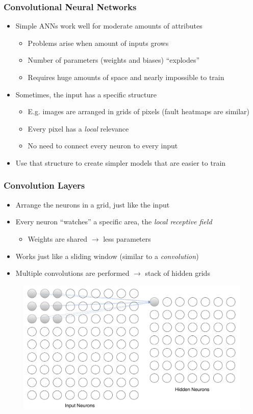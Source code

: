 \begin{frame}
  \frametitle{Convolutional Neural Networks}
  \begin{itemize}
    \item Simple ANNs work well for moderate amounts of attributes
      \begin{itemize}
        \item Problems arise when amount of inputs grows
        \item Number of parameters (weights and biases) ``explodes''
        \item Requires huge amounts of space and nearly impossible to
          train
      \end{itemize}
    \item Sometimes, the input has a specific structure
      \begin{itemize}
        \item E.g. images are arranged in grids of pixels (fault
          heatmaps are similar)
        \item Every pixel has a \textit{local} relevance
        \item No need to connect every neuron to every input
      \end{itemize}
    \item Use that structure to create simpler models that are easier
      to train
  \end{itemize}
\end{frame}

\begin{frame}
  \frametitle{Convolution Layers}
  \begin{itemize}
    \item Arrange the neurons in a grid, just like the input
    \item Every neuron ``watches'' a specific area, the \textit{local
      receptive field}
      \begin{itemize}
        \item Weights are shared \(\rightarrow\) less parameters
      \end{itemize}
    \item Works just like a sliding window (similar to a
      \textit{convolution})
    \item Multiple convolutions are performed \(\rightarrow\) stack of
      hidden grids
  \end{itemize}
  \begin{figure}
    \includegraphics[width=.7\textwidth]{../figures/receptive_field_presentation}
  \end{figure}
\end{frame}

